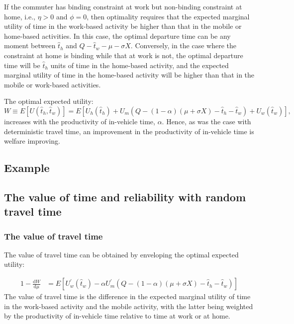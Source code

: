 \documentclass[12pt,a4paper,british]{article}
\theoremstyle{definition}
\theoremstyle{plain}
\theoremstyle{plain}
\begin{document}
If the commuter has binding constraint at work but non-binding constraint
at home, i.e., $\eta>0$ and $\phi=0$, then optimality requires that
the expected marginal utility of time in the work-based activity be
higher than that in the mobile or home-based activities. In this case,
the optimal departure time can be any moment between $\hat{t}_{h}$
and $Q-\hat{t}_{w}-\mu-\sigma X$. Conversely, in the case where the
constraint at home is binding while that at work is not, the optimal
departure time will be $\hat{t}_{h}$ units of time in the home-based
activity, and the expected marginal utility of time in the home-based
activity will be higher than that in the mobile or work-based activities.

The optimal expected utility: 
\[
W\equiv E\left[U\left(\hat{t}_{h},\hat{t}_{w}\right)\right]=E\left[U_{h}\left(\hat{t}_{h}\right)+U_{m}\left(Q-\left(1-\alpha\right)\left(\mu+\sigma X\right)-\hat{t}_{h}-\hat{t}_{w}\right)+U_{w}\left(\hat{t}_{w}\right)\right],
\]
increases with the productivity of in-vehicle time, $\alpha$. Hence,
as was the case with deterministic travel time, an improvement in
the productivity of in-vehicle time is welfare improving.

\subsection{Example}

\subsection{The value of time and reliability with random travel time}

\subsubsection*{The value of travel time}

The value of travel time can be obtained by enveloping the optimal
expected utility:

\begin{alignat*}{1}
-\frac{\mathrm{d}W}{\mathrm{d}\mu} & =E\left[U_{w}^{\prime}\left(\hat{t}_{w}\right)-\alpha U_{m}^{\prime}\left(Q-\left(1-\alpha\right)\left(\mu+\sigma X\right)-\hat{t}_{h}-\hat{t}_{w}\right)\right]
\end{alignat*}
The value of travel time is the difference in the expected marginal
utility of time in the work-based activity and the mobile activity,
with the latter being weighted by the productivity of in-vehicle time
relative to time at work or at home. 
\end{document}
